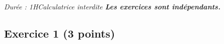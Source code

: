 \documentclass[a4paper,12pt, french]{article}
\date{18 septembre}
\begin{document}
\name

\emph{Durée : 1H\qquad Calculatrice interdite \qquad \textbf{Les exercices sont indépendants.}}

\vspace{-3mm}

\subsection*{Exercice 1 (3 points)}


\newpage
\end{document}
